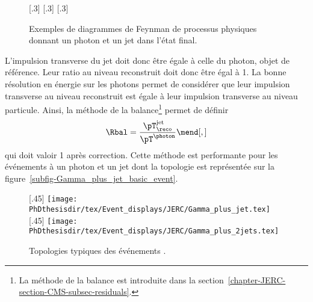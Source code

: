 \begin{figure}[h]
\centering\vspace{\baselineskip}
\subcaptionbox{\label{subfig-fgraph-gq_qGamma_S}}[.3\textwidth]
{\vspace{\baselineskip}}
\hfill
\subcaptionbox{\label{subfig-fgraph-gq_qGamma_T}}[.3\textwidth]
{\vspace{\baselineskip}}
\hfill
\subcaptionbox{\label{subfig-fgraph-qq_gGamma}}[.3\textwidth]
{\vspace{\baselineskip}}
\caption[Diagrammes de Feynman donnant un photon et un jet dans l'état final.]{Exemples de diagrammes de Feynman de processus physiques donnant un photon et un jet dans l'état final.}
\label{fig-fgraph-gamma_plus_jets}
\end{figure}
\par L'impulsion transverse du jet doit donc être égale à celle du photon, objet de référence. Leur ratio au niveau reconstruit doit donc être égal à 1.
La bonne résolution en énergie sur les photons permet de considérer que leur impulsion transverse au niveau reconstruit est égale à leur impulsion transverse au niveau particule.
Ainsi, la méthode de la balance\footnote{La méthode de la balance est introduite dans la section~\ref{chapter-JERC-section-CMS-subsec-residuals}.} permet de définir
\begin{equation}
\Rbal = \frac{\pT_\reco^\text{jet}}{\pT^{\photon}}
\mend[,]
\end{equation}
qui doit valoir 1 après correction.
Cette méthode est performante pour les événements à un photon et un jet dont la topologie est représentée sur la figure~\ref{subfig-Gamma_plus_jet_basic_event}.
\begin{figure}[h]
\centering
{}[.45\textwidth]
{\texttt{[image: \\PhDthesisdir/tex/Event\_displays/JERC/Gamma\_plus\_jet.tex]}}
\qquad
{}[.45\textwidth]
{\texttt{[image: \\PhDthesisdir/tex/Event\_displays/JERC/Gamma\_plus\_2jets.tex]}}
\caption{Topologies typiques des événements \Gjet.}
\label{fig-Gamma_plus_jet_events}
\end{figure}
